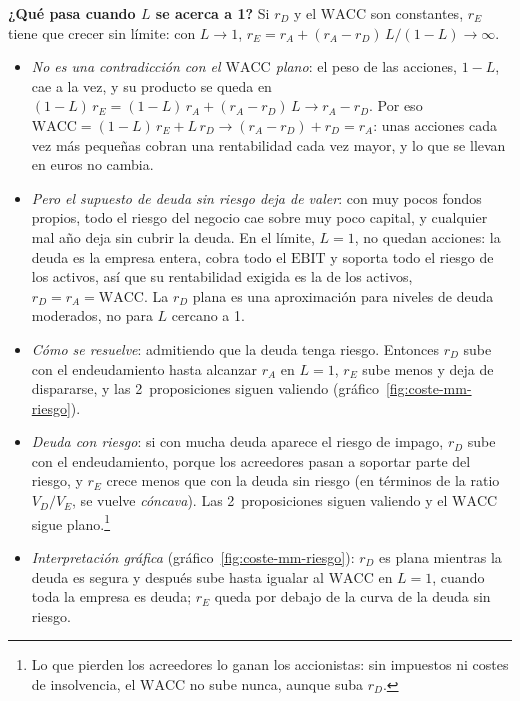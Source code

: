 \documentclass[11pt]{article}
\begin{document}
\begin{anotaciones}
\textbf{¿Qué pasa cuando $L$ se acerca a 1?} Si $r_D$ y el $\mathrm{WACC}$ son constantes, $r_E$ tiene que crecer sin límite: con $L\to1$, $r_E=r_A+(r_A-r_D)\,L/(1-L)\to\infty$.
\begin{itemize}
\item \emph{No es una contradicción con el $\mathrm{WACC}$ plano}: el peso de las acciones, $1-L$, cae a la vez, y su producto se queda en $(1-L)\,r_E=(1-L)\,r_A+(r_A-r_D)\,L\to r_A-r_D$. Por eso $\mathrm{WACC}=(1-L)\,r_E+L\,r_D\to(r_A-r_D)+r_D=r_A$: unas acciones cada vez más pequeñas cobran una rentabilidad cada vez mayor, y lo que se llevan en euros no cambia.
\item \emph{Pero el supuesto de deuda sin riesgo deja de valer}: con muy pocos fondos propios, todo el riesgo del negocio cae sobre muy poco capital, y cualquier mal año deja sin cubrir la deuda. En el límite, $L=1$, no quedan acciones: la deuda es la empresa entera, cobra todo el $\mathrm{EBIT}$ y soporta todo el riesgo de los activos, así que su rentabilidad exigida es la de los activos, $r_D=r_A=\mathrm{WACC}$. La $r_D$ plana es una aproximación para niveles de deuda moderados, no para $L$ cercano a 1.
\item \emph{Cómo se resuelve}: admitiendo que la deuda tenga riesgo. Entonces $r_D$ sube con el endeudamiento hasta alcanzar $r_A$ en $L=1$, $r_E$ sube menos y deja de dispararse, y las 2~proposiciones siguen valiendo (gráfico~\ref{fig:coste-mm-riesgo}).
\end{itemize}
\end{anotaciones}

\begin{itemize}
\item \emph{Deuda con riesgo}: si con mucha deuda aparece el riesgo de impago, $r_D$ sube con el endeudamiento, porque los acreedores pasan a soportar parte del riesgo, y $r_E$ crece menos que con la deuda sin riesgo (en términos de la ratio $V_D/V_E$, se vuelve \emph{cóncava}). Las 2~proposiciones siguen valiendo y el $\mathrm{WACC}$ sigue plano.\footnote{Lo que pierden los acreedores lo ganan los accionistas: sin impuestos ni costes de insolvencia, el $\mathrm{WACC}$ no sube nunca, aunque suba $r_D$.}
\item \emph{Interpretación gráfica} (gráfico~\ref{fig:coste-mm-riesgo}): $r_D$ es plana mientras la deuda es segura y después sube hasta igualar al $\mathrm{WACC}$ en $L=1$, cuando toda la empresa es deuda; $r_E$ queda por debajo de la curva de la deuda sin riesgo.
\end{itemize}
\end{document}
